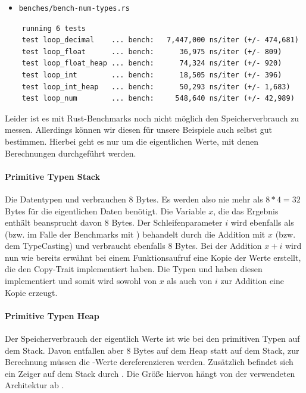 \documentclass[11pt,a4paper, ngerman]{article}
\begin{document}
\begin{itemize}
    \item \begin{verbatim}benches/bench-num-types.rs\end{verbatim}
\end{itemize}

\begin{verbatim}
    running 6 tests
    test loop_decimal    ... bench:   7,447,000 ns/iter (+/- 474,681)
    test loop_float      ... bench:      36,975 ns/iter (+/- 809)
    test loop_float_heap ... bench:      74,324 ns/iter (+/- 920)
    test loop_int        ... bench:      18,505 ns/iter (+/- 396)
    test loop_int_heap   ... bench:      50,293 ns/iter (+/- 1,683)
    test loop_num        ... bench:     548,640 ns/iter (+/- 42,989)
\end{verbatim}

Leider ist es mit Rust-Benchmarks noch nicht möglich den Speicherverbrauch zu messen. Allerdings können wir diesen für unsere Beispiele auch selbst gut bestimmen. Hierbei geht es nur um die eigentlichen Werte, mit denen Berechnungen durchgeführt werden.

\paragraph{Primitive Typen Stack} Die Datentypen  und  verbrauchen 8 Bytes. Es werden also nie mehr als $8*4=32$ Bytes für die eigentlichen Daten benötigt. Die Variable $x$, die das Ergebnis enthält beansprucht davon 8 Bytes. Der Schleifenparameter $i$ wird ebenfalls als  (bzw.  im Falle der Benchmarks mit ) behandelt durch die Addition mit $x$ (bzw. dem TypeCasting) und verbraucht ebenfalls 8 Bytes. Bei der Addition $x+i$ wird nun wie bereits erwähnt bei einem Funktionsaufruf eine Kopie der Werte erstellt, die den Copy-Trait implementiert haben. Die Typen  und  haben diesen implementiert \cite{Rusti64Copy} und somit wird sowohl von $x$ als auch von $i$ zur Addition eine Kopie erzeugt.

\paragraph{Primitive Typen Heap} Der Speicherverbrauch der eigentlich Werte ist wie bei den primitiven Typen auf dem Stack. Davon entfallen aber 8 Bytes auf dem Heap statt auf dem Stack, zur Berechnung müssen die -Werte dereferenzieren werden. Zusätzlich befindet sich ein Zeiger auf dem Stack durch . Die Größe hiervon hängt von der verwendeten Architektur ab \cite{BoxExmaple}.
\end{document}
